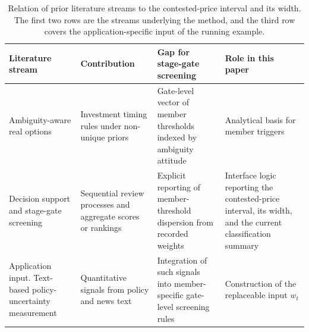 \begin{table}[!t]
\caption{Relation of prior literature streams to the contested-price interval and its width. The first two rows are the streams underlying the method, and the third row covers the application-specific input of the running example.}
\label{tab:lit}
\centering
\footnotesize
\renewcommand{\arraystretch}{1.15}
\begin{tabular}{@{}L{0.27\textwidth}L{0.18\textwidth}L{0.22\textwidth}L{0.25\textwidth}@{}}
\toprule
Literature stream & Contribution & Gap for stage-gate screening & Role in this paper\\
\midrule
Ambiguity-aware real options \citep{NishimuraOzaki2007,TrojanowskaKort2010,Schroder2011,Fan2023} & Investment timing rules under non-unique priors & Gate-level vector of member thresholds indexed by ambiguity attitude & Analytical basis for member triggers\\
Decision support and stage-gate screening \citep{Sprague1980,Cooper2008,ShenLi2023,Saiz2024,Shen2025,Violos2025} & Sequential review processes and aggregate scores or rankings & Explicit reporting of member-threshold dispersion from recorded weights & Interface logic reporting the contested-price interval, its width, and the current classification summary\\
Application input. Text-based policy-uncertainty measurement \citep{Baker2016,Gavriilidis2021,Ma2023,Hartley2025} & Quantitative signals from policy and news text & Integration of such signals into member-specific gate-level screening rules & Construction of the replaceable input $w_t$\\
\bottomrule
\end{tabular}
\end{table}
